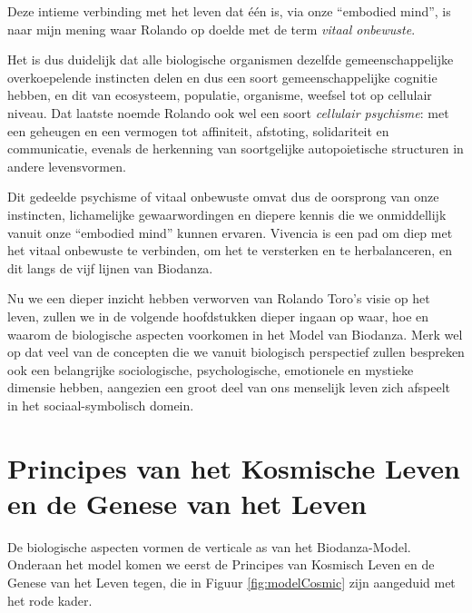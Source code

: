 \documentclass[
  11pt,
]{book}
\begin{document}
Deze intieme verbinding met het leven dat één is, via onze ``embodied mind'', is naar mijn mening waar Rolando op doelde met de term \emph{vitaal onbewuste}.

Het is dus duidelijk dat alle biologische organismen dezelfde gemeenschappelijke overkoepelende instincten delen en dus een soort gemeenschappelijke cognitie hebben, en dit van ecosysteem, populatie, organisme, weefsel tot op cellulair niveau. Dat laatste noemde Rolando ook wel een soort \emph{cellulair psychisme}: met een geheugen en een vermogen tot affiniteit, afstoting, solidariteit en communicatie, evenals de herkenning van soortgelijke autopoietische structuren in andere levensvormen.

Dit gedeelde psychisme of vitaal onbewuste omvat dus de oorsprong van onze instincten, lichamelijke gewaarwordingen en diepere kennis die we onmiddellijk vanuit onze ``embodied mind'' kunnen ervaren. Vivencia is een pad om diep met het vitaal onbewuste te verbinden, om het te versterken en te herbalanceren, en dit langs de vijf lijnen van Biodanza.

Nu we een dieper inzicht hebben verworven van Rolando Toro's visie op het leven, zullen we in de volgende hoofdstukken dieper ingaan op waar, hoe en waarom de biologische aspecten voorkomen in het Model van Biodanza. Merk wel op dat veel van de concepten die we vanuit biologisch perspectief zullen bespreken ook een belangrijke sociologische, psychologische, emotionele en mystieke dimensie hebben, aangezien een groot deel van ons menselijk leven zich afspeelt in het sociaal-symbolisch domein.

\hypertarget{principes-van-het-kosmische-leven-en-de-genese-van-het-leven}{%
\chapter{Principes van het Kosmische Leven en de Genese van het Leven}\label{principes-van-het-kosmische-leven-en-de-genese-van-het-leven}}

De biologische aspecten vormen de verticale as van het Biodanza-Model. Onderaan het model komen we eerst de Principes van Kosmisch Leven en de Genese van het Leven tegen, die in Figuur \ref{fig:modelCosmic} zijn aangeduid met het rode kader.
\end{document}
